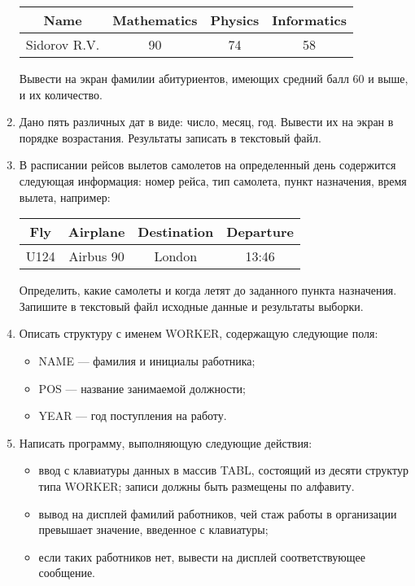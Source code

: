\begin{enumerate}[leftmargin=*]
\begin{table}[H]
\begin{tabular}{|c|c|c|c|}
            \textbf{Name} & \textbf{Mathematics} & \textbf{Physics} & \textbf{Informatics} \\
            \hline
            Sidorov R.V. & 90 & 74 & 58 \\
            \hline
        \end{tabular}
    \end{table}
    Вывести на экран фамилии абитуриентов, имеющих средний балл 60 и выше, и их количество.
    \item Дано пять различных дат в виде: число, месяц, год. Вывести их на экран в порядке возрастания. Результаты записать в текстовый файл.
    \item В расписании рейсов вылетов самолетов на определенный день содержится следующая информация: номер рейса, тип самолета, пункт назначения, время вылета, например:
    \begin{table}[H]
        \centering
        \renewcommand{\arraystretch}{1.5}
        \renewcommand{\tabcolsep}{1.2cm}
        \begin{tabular}{|c|c|c|c|}
            \hline
            \textbf{Fly} & \textbf{Airplane} & \textbf{Destination} & \textbf{Departure} \\
            \hline
            U124 & Airbus 90 & London & 13:46 \\
            \hline
        \end{tabular}
    \end{table}
    Определить, какие самолеты и когда летят до заданного пункта назначения. Запишите в текстовый файл исходные данные и результаты выборки.
    \item Описать структуру с именем WORKER, содержащую следующие поля:
    \begin{itemize}
        \item NAME — фамилия и инициалы работника;
        \item POS — название занимаемой должности;
        \item YEAR — год поступления на работу.
    \end{itemize}
    \item Написать программу, выполняющую следующие действия:
    \begin{itemize}
        \item ввод с клавиатуры данных в массив TABL, состоящий из десяти структур типа WORKER; записи должны быть размещены по алфавиту.
        \item вывод на дисплей фамилий работников, чей стаж работы в организации превышает значение, введенное с клавиатуры;
        \item если таких работников нет, вывести на дисплей соответствующее сообщение.
    \end{itemize}
\end{enumerate}